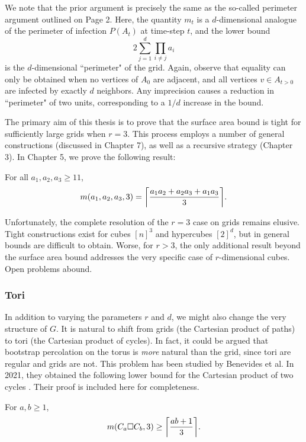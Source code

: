 We note that the prior argument is precisely the same as the so-called perimeter argument outlined on Page 2. Here, the quantity $m_t$ is a $d$-dimensional analogue of the perimeter of infection $P(A_t)$ at time-step $t$, and the lower bound
$$2\sum_{j=1}^d \prod_{i \neq j} a_i$$
is the $d$-dimensional ``perimeter" of the grid. Again, observe that equality can only be obtained when no vertices of $A_0$ are adjacent, and all vertices $v \in A_{t>0}$ are infected by exactly $d$ neighbors. Any imprecision causes a reduction in ``perimeter" of two units, corresponding to a $1/d$ increase in the bound. 

The primary aim of this thesis is to prove that the surface area bound is tight for sufficiently large grids when $r=3$. This process employs a number of general constructions (discussed in Chapter 7), as well as a recursive strategy (Chapter 3). In Chapter 5, we prove the following result:

\begin{thm}
\label{thm:main_result}
For all $a_1, a_2, a_3 \geq 11$, 
$$m(a_1,a_2,a_3,3) = \ceil*{\frac{a_1a_2+a_2a_3+a_1a_3}{3}}.$$
\end{thm}

Unfortunately, the complete resolution of the $r=3$ case on grids remains elusive. Tight constructions exist for cubes $[n]^3$ and hypercubes $[2]^d$, but in general bounds are difficult to obtain. Worse, for $r>3$, the only additional result beyond the surface area bound addresses the very specific case of $r$-dimensional cubes. Open problems abound.

\subsubsection{Tori}

In addition to varying the parameters $r$ and $d$, we might also change the very structure of $G$. It is natural to shift from grids (the Cartesian product of paths) to tori (the Cartesian product of cycles). In fact, it could be argued that bootstrap percolation on the torus is \emph{more} natural than the grid, since tori are regular and grids are not. This problem has been studied by Benevides et al. In 2021, they obtained the following lower bound for the Cartesian product of two cycles \cite{benevides:2021}. Their proof is included here for completeness.

\begin{thm}
\label{thm:torus_lb}
For $a, b \geq 1$,
$$m(C_a \square C_b,3) \geq \ceil*{\frac{ab +1}{3}}.$$
\end{thm}

